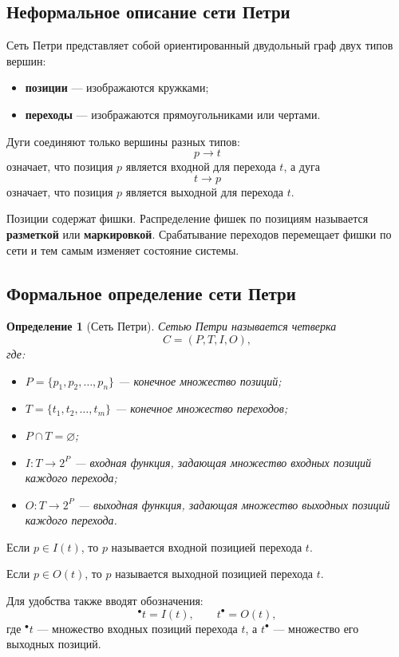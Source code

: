 \documentclass[12pt,a4paper]{article}
\newtheorem{definition}{Определение}
\begin{document}
\subsection{Неформальное описание сети Петри}

Сеть Петри представляет собой ориентированный двудольный граф двух типов вершин:
\begin{itemize}
    \item \textbf{позиции} --- изображаются кружками;
    \item \textbf{переходы} --- изображаются прямоугольниками или чертами.
\end{itemize}

Дуги соединяют только вершины разных типов:
\[
p \to t
\]
означает, что позиция $p$ является входной для перехода $t$, а дуга
\[
t \to p
\]
означает, что позиция $p$ является выходной для перехода $t$.

Позиции содержат фишки. Распределение фишек по позициям называется \textbf{разметкой} или \textbf{маркировкой}. Срабатывание переходов перемещает фишки по сети и тем самым изменяет состояние системы.

\subsection{Формальное определение сети Петри}

\begin{definition}[Сеть Петри]
Сетью Петри называется четверка
\[
C = (P,T,I,O),
\]
где:
\begin{itemize}
    \item $P = \{p_1,p_2,\dots,p_n\}$ --- конечное множество позиций;
    \item $T = \{t_1,t_2,\dots,t_m\}$ --- конечное множество переходов;
    \item $P \cap T = \varnothing$;
    \item $I : T \to 2^P$ --- входная функция, задающая множество входных позиций каждого перехода;
    \item $O : T \to 2^P$ --- выходная функция, задающая множество выходных позиций каждого перехода.
\end{itemize}
\end{definition}

Если $p \in I(t)$, то $p$ называется входной позицией перехода $t$.

Если $p \in O(t)$, то $p$ называется выходной позицией перехода $t$.

Для удобства также вводят обозначения:
\[
{}^\bullet t = I(t),
\qquad
t^\bullet = O(t),
\]
где ${}^\bullet t$ --- множество входных позиций перехода $t$, а $t^\bullet$ --- множество его выходных позиций.
\end{document}
